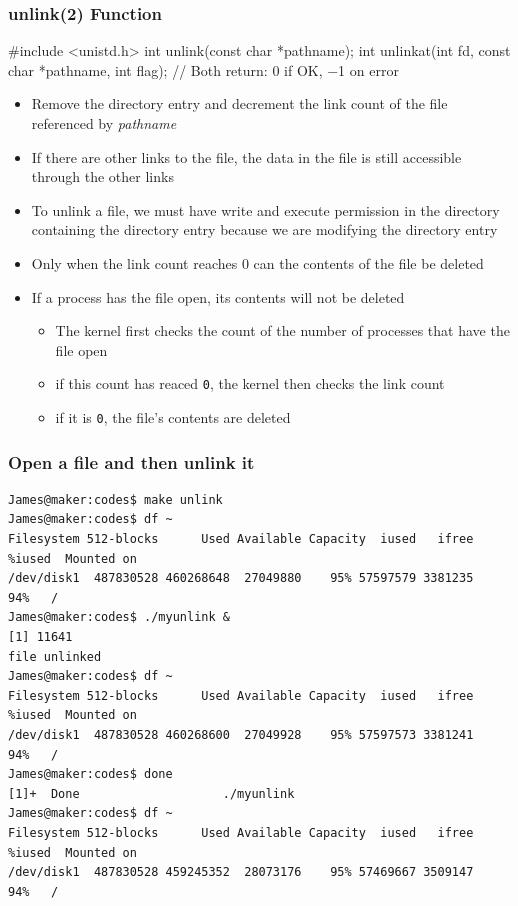 \documentclass[newPxFont,sthlmFooter,nooffset]{beamer}
\begin{document}
\begin{frame}[containsverbatim,t]
  \frametitle{unlink(2) Function}
\begin{codedef}
#include <unistd.h>
int unlink(const char *pathname);
int unlinkat(int fd, const char *pathname, int flag);
// Both return: 0 if OK, −1 on error
\end{codedef}

{\footnotesize
\begin{itemize}
\item Remove the directory entry and decrement the link count of the file referenced by \textit{pathname}
\item If there are other links to the file, the data in the file is still accessible through the other links
\item To unlink a file, we must have write  and execute permission in the directory containing the directory entry because we are modifying the directory entry 
\item Only when the link count reaches 0 can the contents of the file be deleted
\item If a process has the file open, its contents will not be deleted
  \begin{itemize}
  \item The kernel first checks the count of the number of processes that have the file open
  \item if this count has reaced \texttt{0}, the kernel then checks the link count
  \item if it is \texttt{0}, the file's contents are deleted
  \end{itemize}
\end{itemize}
}
\end{frame}

\begin{frame}[fragile]
  \frametitle{Open a file and then unlink it}
{\footnotesize
\begin{verbatim}
James@maker:codes$ make unlink
James@maker:codes$ df ~
Filesystem 512-blocks      Used Available Capacity  iused   ifree %iused  Mounted on
/dev/disk1  487830528 460268648  27049880    95% 57597579 3381235   94%   /
James@maker:codes$ ./myunlink &
[1] 11641
file unlinked
James@maker:codes$ df ~
Filesystem 512-blocks      Used Available Capacity  iused   ifree %iused  Mounted on
/dev/disk1  487830528 460268600  27049928    95% 57597573 3381241   94%   /
James@maker:codes$ done
[1]+  Done                    ./myunlink
James@maker:codes$ df ~
Filesystem 512-blocks      Used Available Capacity  iused   ifree %iused  Mounted on
/dev/disk1  487830528 459245352  28073176    95% 57469667 3509147   94%   /
\end{verbatim}
}
\end{frame}
\end{document}
